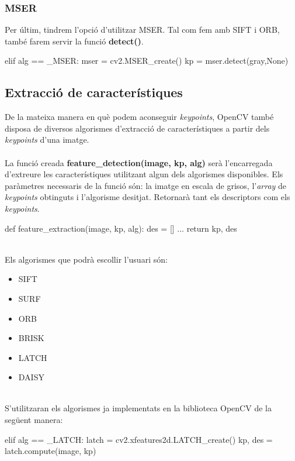 		\subsubsection{MSER}
		Per últim, tindrem l'opció d'utilitzar MSER. Tal com fem amb SIFT i ORB, també farem servir la funció \textbf{detect()}.\\
		\begin{python}
	elif alg == _MSER:
		mser = cv2.MSER_create()
		kp = mser.detect(gray,None)
		\end{python}
\newpage
	\subsection{Extracció de característiques}
		De la mateixa manera en què podem aconseguir \textit{keypoints}, OpenCV també disposa de diversos algorismes d'extracció de característiques a partir dels \textit{keypoints} d'una imatge.\\\\
		La funció creada \textbf{feature{\_}detection(image, kp, alg)} serà l'encarregada d'extreure les característiques utilitzant algun dels algorismes disponibles. Els paràmetres necessaris de la funció són:
		la imatge en escala de grisos, l'\textit{array} de \textit{keypoints} obtinguts i l'algorisme desitjat. Retornarà tant els descriptors com els \textit{keypoints}.\\

		\begin{python}
def feature_extraction(image, kp, alg):
	des = []
	...
	return kp, des
		\end{python}
		\ \\Els algorismes que podrà escollir l'usuari són:
		\begin{multicols}{3} 
			\begin{itemize}
				\item{SIFT}
				\item{SURF}
				\item{ORB}
				\item{BRISK}
				\item{LATCH}
				\item{DAISY}
			\end{itemize}
		\end{multicols}
	\ \\S'utilitzaran els algorismes ja implementats en la biblioteca OpenCV de la següent manera:\\

		\begin{python}
	elif alg == _LATCH:
		latch = cv2.xfeatures2d.LATCH_create()
		kp, des = latch.compute(image, kp)
		\end{python}

